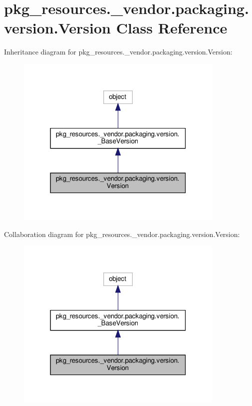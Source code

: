 \hypertarget{classpkg__resources_1_1__vendor_1_1packaging_1_1version_1_1Version}{}\section{pkg\+\_\+resources.\+\_\+vendor.\+packaging.\+version.\+Version Class Reference}
\label{classpkg__resources_1_1__vendor_1_1packaging_1_1version_1_1Version}


Inheritance diagram for pkg\+\_\+resources.\+\_\+vendor.\+packaging.\+version.\+Version\+:
\nopagebreak
\begin{figure}[H]
\begin{center}
\leavevmode
\includegraphics[width=283pt]{classpkg__resources_1_1__vendor_1_1packaging_1_1version_1_1Version__inherit__graph}
\end{center}
\end{figure}


Collaboration diagram for pkg\+\_\+resources.\+\_\+vendor.\+packaging.\+version.\+Version\+:
\nopagebreak
\begin{figure}[H]
\begin{center}
\leavevmode
\includegraphics[width=283pt]{classpkg__resources_1_1__vendor_1_1packaging_1_1version_1_1Version__coll__graph}
\end{center}
\end{figure}
